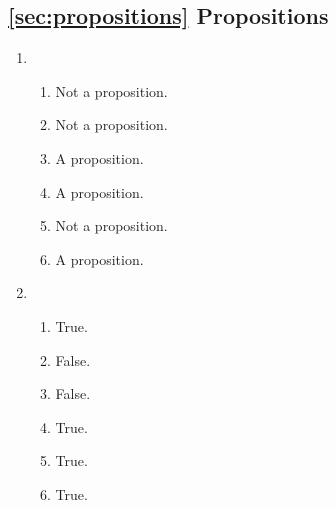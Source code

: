 \documentclass{article}
\begin{document}
  \subsection*{\ref{sec:propositions} Propositions}

      \begin{enumerate} 
        \item
          \begin{enumerate}
            \item Not a proposition.
            \item Not a proposition.
            \item A proposition.
            \item A proposition.
            \item Not a proposition.
            \item A proposition.
          \end{enumerate}
        \item
          \begin{enumerate}
            \item True.
            \item False.
            \item False.
            \item True.
            \item True.
            \item True.
          \end{enumerate}
      \end{enumerate}
      
\end{document}
